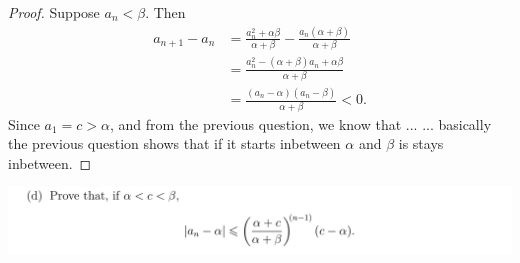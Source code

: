 \documentclass[12pt]{article}
\begin{document}
\begin{proof}
  Suppose $a_n < \beta$. Then
  \begin{align*}
    a_{n+1} - a_n
    &= \frac{a_n^2 + \alpha\beta}{\alpha + \beta} - \frac{a_n(\alpha + \beta)}{\alpha + \beta}\\
    &= \frac{a_n^2 - (\alpha + \beta)a_n + \alpha\beta}{\alpha + \beta}\\
    &= \frac{(a_n - \alpha)(a_n - \beta)}{\alpha + \beta} < 0.
  \end{align*}
  Since $a_1 = c > \alpha$, and from the previous question, we know that ...
  ... basically the previous question shows that if it starts inbetween $\alpha$ and $\beta$ is stays inbetween.

\end{proof}

\begin{mdframed}
\includegraphics[width=400pt]{img/oxford-M2-analysis-I-4-6-d.png}
\end{mdframed}

\newpage
\end{document}
